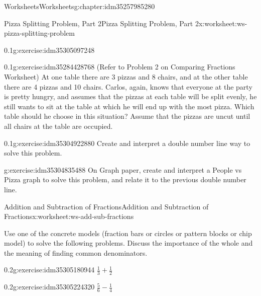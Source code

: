 \documentclass[twoside,11pt,]{book}
\begin{document}
\begin{chapterptx}{Worksheets}{}{Worksheets}{}{}{g:chapter:idm35257985280}
\begin{worksheet-section-numberless}{Pizza Splitting Problem, Part 2}{}{Pizza Splitting Problem, Part 2}{}{}{x:worksheet:ws-pizza-splitting-problem}
\begin{divisionexercise}{3}{}{0.1}{g:exercise:idm35305097248}
\begin{sidebyside}{1}{0.05}{0.05}{0}
\begin{sbspanel}{0.9}
\end{sbspanel}%
\end{sidebyside}%
\end{divisionexercise}%
\begin{divisionexercise}{4}{}{0.1}{g:exercise:idm35284428768}%
(Refer to Problem 2 on Comparing Fractions Worksheet) At one table there are 3 pizzas and 8 chairs, and at the other table there are 4 pizzas and 10 chairs.  Carlos, again, knows that everyone at the party is pretty hungry, and assumes that the pizzas at each table will be split evenly, he still wants to sit at the table at which he will end up with the most pizza.  Which table should he choose in this situation? Assume that the pizzas are uncut until all chairs at the table are occupied.%
\end{divisionexercise}%
\begin{divisionexercise}{5}{}{0.1}{g:exercise:idm35304922880}%
Create and interpret a double number line way to solve this problem.%
\end{divisionexercise}%
\begin{divisionexercise}{6}{}{}{g:exercise:idm35304835488}%
On Graph paper, create and interpret a People vs Pizza graph to solve this problem, and relate it to the previous double number line.%
\end{divisionexercise}%
\end{worksheet-section-numberless}
\restoregeometry
%
%
\typeout{************************************************}
\typeout{************************************************}
%
\begin{worksheet-section-numberless}{Addition and Subtraction of Fractions}{}{Addition and Subtraction of Fractions}{}{}{x:worksheet:ws-add-sub-fractions}
\begin{introduction}{}%
Use one of the concrete models (fraction bars or circles or pattern blocks or chip model) to solve the following problems. Discuss the importance of the whole and the meaning of finding common denominators.%
\end{introduction}%
\begin{divisionexercise}{1}{}{0.2}{g:exercise:idm35305180944}%
\(\frac{1}{3} + \frac{1}{2} \)%
\end{divisionexercise}%
\begin{divisionexercise}{2}{}{0.2}{g:exercise:idm35305224320}%
\(\frac{5}{6} - \frac{1}{4} \)%
\end{divisionexercise}%

\end{worksheet-section-numberless}
\end{chapterptx}
\end{document}
